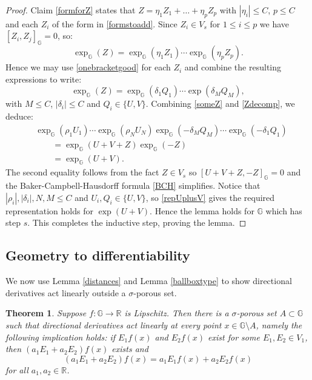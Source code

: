 \documentclass[reqno, 11pt]{amsart}
\newtheorem{theorem}{Theorem}
\theoremstyle{definition}
\theoremstyle{remark}
\numberwithin{theorem}{section}
\numberwithin{equation}{section}
\begin{document}
\begin{proof}
Claim \ref{formforZ} states that $Z=\eta_{1}Z_{1}+ \ldots +\eta_{p}Z_{p}$ with $|\eta_{i}|\leq C$, $p \leq C$ and each $Z_{i}$ of the form in \eqref{formstoadd}. Since $Z_{i}\in V_{s}$ for $1\leq i\leq p$ we have $[Z_{i},Z_{j}]_{\mathbb{G}}=0$, so:
\[\exp_{\mathbb{G}}(Z)=\exp_{\mathbb{G}}(\eta_{1} Z_1)\cdots \exp_{\mathbb{G}}(\eta_{p}Z_p).\]
Hence we may use \eqref{onebracketgood} for each $Z_{i}$ and combine the resulting expressions to write:
\begin{equation}\label{Zdecomp} \exp_{\mathbb{G}}(Z)= \exp_{\mathbb{G}}(\delta_{1}Q_{1})\cdots \exp(\delta_{M}Q_{M}),\end{equation}
with $M\leq C$, $|\delta_{i}|\leq C$ and $Q_{i}\in \{ U, V\}$. Combining \eqref{someZ} and \eqref{Zdecomp}, we deduce:
\begin{align}\label{repUplusV}
& \exp_{\mathbb{G}}(\rho_{1}U_1)\cdots \exp_{\mathbb{G}}(\rho_{N}U_N)  \exp_{\mathbb{G}}(-\delta_{M}Q_{M})\cdots \exp_{\mathbb{G}}(-\delta_{1}Q_{1}) \nonumber \\
&\qquad = \exp_{\mathbb{G}}(U+V+Z)\exp_{\mathbb{G}}(-Z)\nonumber \\
&\qquad =\exp_{\mathbb{G}}(U+V).
\end{align}
The second equality follows from the fact $Z\in V_{s}$ so $[U+V+Z,-Z]_{\mathbb{G}}=0$ and the Baker-Campbell-Hausdorff formula \eqref{BCH} simplifies. Notice that $|\rho_{i}|, |\delta_{i}|, N,M \leq C$ and $U_{i}, Q_{i} \in \{ U, V\}$, so \eqref{repUplusV} gives the required representation holds for $\exp(U+V)$. Hence the lemma holds for $\mathbb{G}$ which has step $s$. This completes the inductive step, proving the lemma.
\end{proof}

\subsection{Geometry to differentiability}

We now use Lemma \ref{distances} and Lemma \ref{ballboxtype} to show directional derivatives act linearly outside a $\sigma$-porous set.

\begin{theorem}\label{porosityderivatives}
Suppose $f\colon \mathbb{G} \to \mathbb{R}$ is Lipschitz. Then there is a $\sigma$-porous set $A\subset \mathbb{G}$ such that directional derivatives act linearly at every point $x\in \mathbb{G} \setminus A$, namely the following implication holds:
if $E_{1}f(x)$ and $E_{2}f(x)$ exist for some $E_{1}, E_{2}\in V_{1}$, then $(a_{1}E_{1}+a_{2}E_{2})f(x)$ exists and
\[(a_{1}E_{1}+a_{2}E_{2})f(x)=a_{1}E_{1}f(x)+a_{2}E_{2}f(x)\]
for all $a_{1}, a_{2}\in \mathbb{R}$.
\end{theorem}
\end{document}
